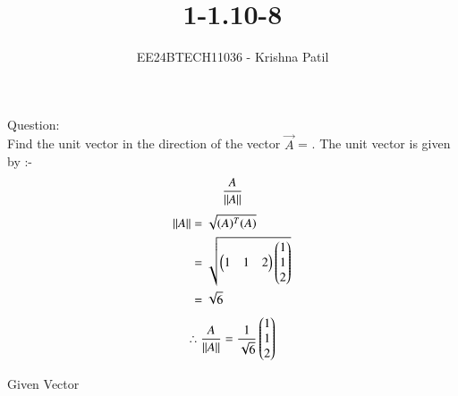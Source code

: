 \documentclass[journal]{IEEEtran}
\begin{document}

\vspace{3cm}

\title{1-1.10-8}
\author{EE24BTECH11036 - Krishna Patil}
{\let\newpage\relax\maketitle}
Question:\\
Find the unit vector in the direction of the vector  $\vec{A}$ = . 
\solution
The unit vector is given by :-
\begin{align}
	\frac{A}{\left\lVert A\right\rVert}
\end{align}
\begin{align}
	\left\lVert A\right\rVert &= \sqrt{(A)^T(A)}\\
	&= \sqrt{\begin{pmatrix}1 & 1 & 2\end{pmatrix}\begin{pmatrix}1\\1\\2\end{pmatrix}}\\
	&= \sqrt{6} 
 \end{align}
\centering
\begin{align}
\therefore  \frac {A}{\left\lVert A\right\rVert} = \frac{1}{\sqrt{6}} \begin{pmatrix}1\\1\\2\end{pmatrix} \\
\end{align}
\begin{table}[h!]    
  \centering
  
  \caption{Given Vector}
  \label{tab1-1.9-6}
\end{table}
\end{document}
